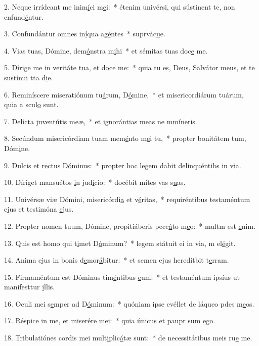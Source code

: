 2. Neque irrídeant me inim\uline{í}ci m\uline{e}i:~* étenim univérsi, qui sústinent te, non cnfund\uline{é}ntur.\par 
3. Confundántur omnes in\uline{í}qua ag\uline{é}ntes~* suprvác\uline{u}e.\par 
4. Vias tuas, Dómine, dem\uline{ó}nstra m\uline{i}hi~* et sémitas tuas doc\uline{e} me.\par 
5. Dírige me in veritáte t\uline{u}a, et d\uline{o}ce me:~* quia tu es, Deus, Salvátor meus, et te sustínui tta d\uline{i}e.\par 
6. Reminíscere miseratiónum tu\uline{á}rum, D\uline{ó}mine,~* et misericordiárum tuárum, quia a scul\uline{o} sunt.\par 
7. Delícta juvent\uline{ú}tis m\uline{e}æ,~* et ignorántias meas ne mmín\uline{e}ris.\par 
8. Secúndum misericórdiam tuam mem\uline{é}nto m\uline{e}i tu,~* propter bonitátem tum, Dóm\uline{i}ne.\par 
9. Dulcis et r\uline{e}ctus D\uline{ó}minus:~* propter hoc legem dabit delinquéntibs in v\uline{i}a.\par 
10. Díriget mansuétos \uline{i}n jud\uline{í}cio:~* docébit mites vas s\uline{u}as.\par 
11. Univérsæ viæ Dómini, misericórdi\uline{a} et v\uline{é}ritas,~* requiréntibus testaméntum ejus et testimóna \uline{e}jus.\par 
12. Propter nomen tuum, Dómine, propitiáberis pecc\uline{á}to m\uline{e}o:~* multm est \uline{e}nim.\par 
13. Quis est homo qui t\uline{i}met D\uline{ó}minum?~* legem státuit ei in via, m el\uline{é}git.\par 
14. Anima ejus in bonis d\uline{e}mor\uline{á}bitur:~* et semen ejus hereditbit t\uline{e}rram.\par 
15. Firmaméntum est Dóminus tim\uline{é}ntibus \uline{e}um:~* et testaméntum ipsíus ut manifesttur \uline{i}llis.\par 
16. Oculi mei s\uline{e}mper ad D\uline{ó}minum:~* quóniam ipse evéllet de láqueo pdes m\uline{e}os.\par 
17. Réspice in me, et miser\uline{é}re m\uline{e}i:~* quia únicus et paupr sum \uline{e}go.\par 
18. Tribulatiónes cordis mei mult\uline{i}plic\uline{á}tæ sunt:~* de necessitátibus meis ru\uline{e} me.\par 
